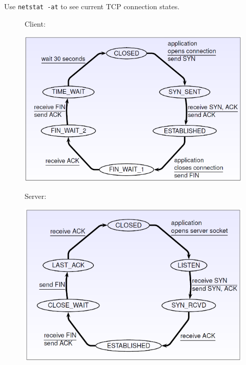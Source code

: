 \documentclass[twocolumn,english]{article}
\begin{document}
Use \texttt{netstat -at} to see current TCP connection states.
\begin{figure}[H]
\centering{}%
\begin{minipage}[t]{0.5\columnwidth}%
Client:
\begin{center}
\includegraphics[width=0.8\linewidth]{img/client-states}
\par\end{center}%
\end{minipage}%
\begin{minipage}[t]{0.5\columnwidth}%
Server:
\begin{center}
\includegraphics[width=0.8\linewidth]{img/server-states}
\par\end{center}%
\end{minipage}
\end{figure}
\end{document}
